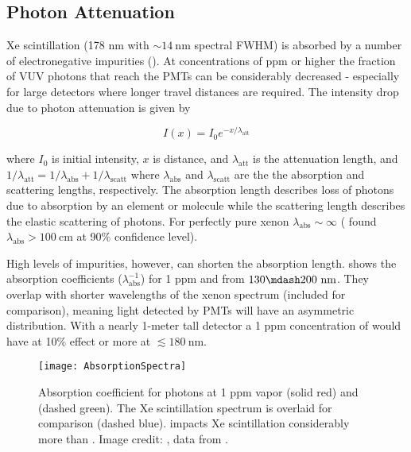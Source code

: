 \subsection{Photon Attenuation}
\label{subsec:importance_procedure_effects_photons}
Xe scintillation (178 nm with ${\sim} 14\ \mathrm{nm}$ spectral FWHM) is absorbed by a number of electronegative impurities
().  At concentrations of ppm or higher
the fraction of VUV photons that reach the PMTs can be considerably decreased - especially for large detectors where longer travel
distances are required.  The intensity drop due to photon attenuation is given by

\begin{equation}
I(x) = I_0 e^{-x / \lambda_{\mathrm{att}}}
\end{equation}

\noindent where $I_0$ is initial intensity, $x$ is distance, and $\lambda_{\mathrm{att}}$ is the attenuation length, and
$1 / \lambda_{\mathrm{att}} = 1 / \lambda_{\mathrm{abs}} + 1 / \lambda_{\mathrm{scatt}}$ where $\lambda_{\mathrm{abs}}$ and
$\lambda_{\mathrm{scatt}}$ are the the absorption and scattering lengths, respectively.  The absorption length describes loss of
photons due to absorption by an element or molecule while the scattering length describes the elastic scattering of photons.  For
perfectly pure xenon
$\lambda_{\mathrm{abs}} \sim \infty$ ( found $\lambda_{\mathrm{abs}} > 100\ \mathrm{cm}$ at 90\% confidence
level).

High levels of impurities, however, can shorten the absorption
length.   shows the absorption coefficients
($\lambda_{\mathrm{abs}}^{-1}$) for 1 ppm \htwoo and \otwo from $130 \mdash 200\ \mathrm{nm}$.  They overlap with shorter wavelengths
of the xenon spectrum (included for comparison), meaning light detected by PMTs will have an asymmetric distribution.  With a nearly
1-meter tall detector a 1 ppm concentration of \htwoo would have at 10\% effect or more at $\lesssim 180\ \mathrm{nm}$.

\begin{figure}
\centering
\texttt{[image: AbsorptionSpectra]}
\caption{Absorption coefficient for photons at 1 ppm  vapor (solid red) and  (dashed green).  The Xe scintillation
spectrum is overlaid for comparison (dashed blue).   impacts Xe scintillation considerably
more than .  Image credit: ,  data from .}
\label{fig:importance_procedure_effects_photons_absorption_coefficents}
\end{figure}

